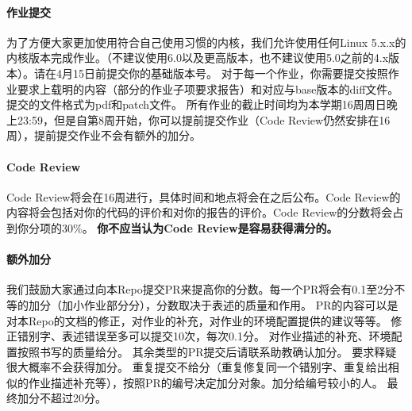 \paragraph*{作业提交}
为了方便大家更加使用符合自己使用习惯的内核，我们允许使用任何Linux 5.x.x的内核版本完成作业。（不建议使用6.0以及更高版本，也不建议使用5.0之前的4.x版本）。请在4月15日前提交你的基础版本号。
对于每一个作业，你需要提交按照作业要求上载明的内容（部分的作业子项要求报告）和对应与base版本的diff文件。提交的文件格式为pdf和patch文件。
所有作业的截止时间均为本学期16周周日晚上23:59，但是自第8周开始，你可以提前提交作业（Code Review仍然安排在16周），提前提交作业不会有额外的加分。

\paragraph*{Code Review}
Code Review将会在16周进行，具体时间和地点将会在之后公布。Code Review的内容将会包括对你的代码的评价和对你的报告的评价。Code Review的分数将会占到你分项的30\%。
\textbf{你不应当认为Code Review是容易获得满分的。}

\paragraph*{额外加分}
我们鼓励大家通过向本Repo提交PR来提高你的分数。每一个PR将会有0.1至2分不等的加分（加小作业部分分），分数取决于表述的质量和作用。
PR的内容可以是对本Repo的文档的修正，对作业的补充，对作业的环境配置提供的建议等等。
修正错别字、表述错误至多可以提交10次，每次0.1分。
对作业描述的补充、环境配置按照书写的质量给分。
其余类型的PR提交后请联系助教确认加分。
要求释疑很大概率不会获得加分。
重复提交不给分（重复修复同一个错别字、重复给出相似的作业描述补充等），按照PR的编号决定加分对象。加分给编号较小的人。
最终加分不超过20分。